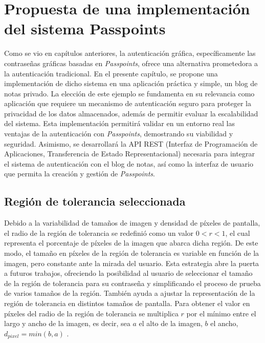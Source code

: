 \chapter{Propuesta de una implementación del sistema Passpoints}\label{chapter:proposal}
Como se vio en capítulos anteriores, la autenticación gráfica, específicamente las contraseñas gráficas basadas en \textit{Passpoints}, ofrece una alternativa prometedora a la autenticación tradicional. En el presente capítulo, se propone una implementación de dicho sistema en una aplicación práctica y simple, un blog de notas privado. La elección de este ejemplo se fundamenta en su relevancia como aplicación que requiere un mecanismo de autenticación seguro para proteger la privacidad de los datos almacenados, además de permitir evaluar la escalabilidad del sistema. Esta implementación permitirá validar en un entorno real las ventajas de la autenticación con \textit{Passpoints}, demostrando su viabilidad y seguridad. Asimismo, se desarrollará la API REST (Interfaz de Programación de Aplicaciones, Transferencia de Estado Representacional) necesaria para integrar el sistema de autenticación con el blog de notas, así como la interfaz de usuario que permita la creación y gestión de \textit{Passpoints}.



\section{Regi\'on de tolerancia seleccionada}

Debido a la variabilidad de tamaños de imagen y densidad de píxeles de pantalla, el radio de la región de tolerancia se redefinió como un valor $0 < r < 1$, el cual representa el porcentaje de píxeles de la imagen que abarca dicha región. De este modo, el tamaño en píxeles de la región de tolerancia es variable en función de la imagen, pero constante ante la mirada del usuario. Esta estrategia abre la puerta a futuros trabajos, ofreciendo la posibilidad al usuario de seleccionar el tamaño de la región de tolerancia para su contraseña y simplificando el proceso de prueba de varios tamaños de la región. Tambi\'en ayuda a ajustar la representaci\'on de la regi\'on de tolerancia en distintos tama\~nos de pantalla. Para obtener el valor en píxeles del radio de la región de tolerancia se multiplica $r$ por el mínimo entre el largo y ancho de la imagen, es decir, sea $a$ el alto de la imagen, $b$ el ancho, $d_{pixel} = min(b,a)$ .

